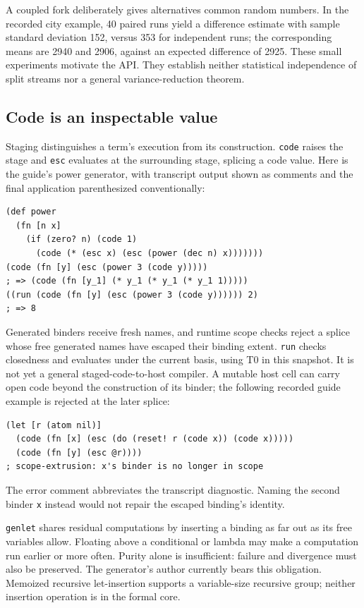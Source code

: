 \documentclass[acmsmall,screen,review,nonacm]{acmart}
\newcommand{\src}[1]{{\normalfont\nolinkurl{#1}}}
\begin{document}
A coupled fork deliberately gives alternatives common random numbers. In the
recorded city example, 40 paired runs yield a difference estimate with sample
standard deviation 152, versus 353 for independent runs; the corresponding
means are 2940 and 2906, against an expected difference of 2925. These small
experiments motivate the API. They establish neither statistical independence
of split streams nor a general variance-reduction theorem.

\subsection{Code is an inspectable value}
Staging distinguishes a term's execution from its construction. \src{code}
raises the stage and \src{esc} evaluates at the surrounding stage, splicing a
code value. Here is the guide's power generator, with transcript output shown
as comments and the final application parenthesized conventionally:
\begin{lstlisting}
(def power
  (fn [n x]
    (if (zero? n) (code 1)
      (code (* (esc x) (esc (power (dec n) x)))))))
(code (fn [y] (esc (power 3 (code y)))))
; => (code (fn [y_1] (* y_1 (* y_1 (* y_1 1)))))
((run (code (fn [y] (esc (power 3 (code y)))))) 2)
; => 8
\end{lstlisting}
Generated binders receive fresh names, and runtime scope checks reject a splice
whose free generated names have escaped their binding extent. \src{run} checks
closedness and evaluates under the current basis, using T0 in this snapshot.
It is not yet a general staged-code-to-host compiler.
A mutable host cell can carry open code beyond the construction of its binder;
the following recorded guide example is rejected at the later splice:
\begin{lstlisting}
(let [r (atom nil)]
  (code (fn [x] (esc (do (reset! r (code x)) (code x)))))
  (code (fn [y] (esc @r))))
; scope-extrusion: x's binder is no longer in scope
\end{lstlisting}
The error comment abbreviates the transcript diagnostic. Naming the second
binder \src{x} instead would not repair the escaped binding's identity.

\src{genlet} shares residual computations by inserting a binding as far out as
its free variables allow. Floating above a conditional or lambda may make a
computation run earlier or more often. Purity alone is insufficient: failure
and divergence must also be preserved. The generator's author currently bears
this obligation. Memoized recursive let-insertion supports a variable-size
recursive group; neither insertion operation is in the formal core.
\end{document}
